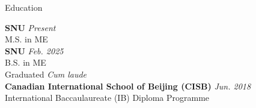 \begin{rSection}{Education}

{\bf \acf{SNU}} \hfill {\em \textit{Present}} \\
M.S. in \acf{ME} \\

{\bf \acf{SNU}} \hfill {\em Feb. 2025} \\
B.S. in \acf{ME} \\
Graduated \textit{Cum laude}\\

{\bf Canadian International School of Beijing (CISB)} \hfill {\em Jun. 2018} \\
International Baccaulaureate (IB) Diploma Programme \\

\end{rSection}